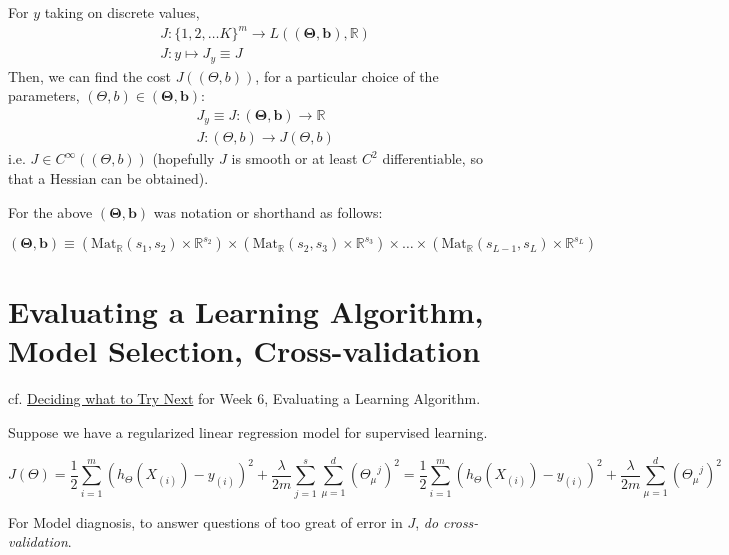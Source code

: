 \documentclass[10pt]{amsart}
\begin{document}
\begin{multicols*}{2}
For $y$ taking on discrete values,
\begin{equation}
\begin{aligned}
  & J: \lbrace 1, 2, \dots K \rbrace^m \to L( \mathbf{ (\Theta ,b) } , \mathbb{R} ) \\ 
  & J: y \mapsto J_y \equiv J 
  \end{aligned}
  \end{equation}
Then, we can find the cost $J((\Theta, b))$, for a particular choice of the parameters, $(\Theta,b) \in \mathbf{ (\Theta,b)}$:
\begin{equation}
\begin{aligned}
 &  J_y \equiv J : \mathbf{ ( \Theta,b) } \to \mathbb{R} \\ 
 & J: (\Theta,b) \to J(\Theta,b)
  \end{aligned}
  \end{equation}
i.e. $J \in C^{\infty}((\Theta,b))$ (hopefully $J$ is smooth or at least $C^2$ differentiable, so that a Hessian can be obtained).


For the above $\mathbf{ (\Theta,b)}$ was notation or shorthand as follows:

\[
\mathbf{ (\Theta,b ) } \equiv (\text{Mat}_{\mathbb{R}}(s_1,s_2) \times \mathbb{R}^{s_2}) \times (\text{Mat}_{\mathbb{R}}(s_2,s_3) \times \mathbb{R}^{s_3} ) \times \dots \times (\text{Mat}_{\mathbb{R}}(s_{L-1},s_L) \times \mathbb{R}^{s_L} )
\]

\section{Evaluating a Learning Algorithm, Model Selection, Cross-validation}  

cf. \href{https://www.coursera.org/learn/machine-learning/lecture/OVM4M/deciding-what-to-try-next}{Deciding what to Try Next} for Week 6, Evaluating a Learning Algorithm.  

Suppose we have a regularized linear regression model for supervised learning.  

\begin{equation}
	J(\Theta) = \frac{1}{2} \sum_{i=1}^m (h_{\Theta}(X_{(i)}) - y_{(i)} )^2 + \frac{\lambda}{2m} \sum_{j=1}^s \sum_{\mu=1}^d (\Theta_{\mu}^{\  \  \  j })^2 =  \frac{1}{2} \sum_{i=1}^m (h_{\Theta}(X_{(i)} ) - y_{(i)} )^2 + \frac{\lambda}{2m} \sum_{\mu =1}^d (\Theta_{\mu}^{ \  \  \  j })^2 
\end{equation}

For Model diagnosis, to answer questions of too great of error in $J$, \emph{do cross-validation}.  


\end{multicols*}
\end{document}
